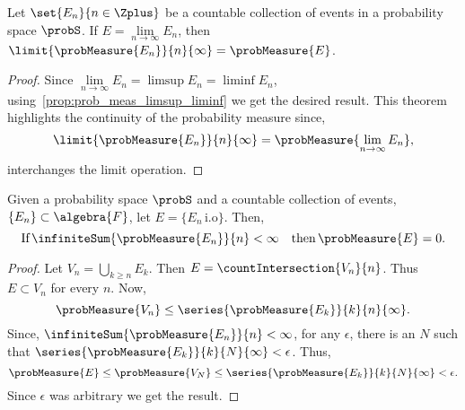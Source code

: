 \begin{Theorem}[name=Continuity of Probability measure]\label{thm:continuity_prob_measure}
    Let $\set{E_n}{n\in\Zplus}$ be a countable collection of events in a probability space $\probS$.
    If $E = \lim\limits_{n\to\infty}E_n$, then $\limit{\probMeasure{E_n}}{n}{\infty} = \probMeasure{E}$. 
\end{Theorem}
\begin{proof}
    Since $\lim\limits_{n\to\infty}E_n = \limsup E_n = \liminf E_n$,
    using~\ref{prop:prob_meas_limsup_liminf} we get the desired result. This theorem highlights the
    continuity of the probability measure since,
    \[\limit{\probMeasure{E_n}}{n}{\infty} = \probMeasure{\lim\limits_{n\to\infty}E_n},\]
    interchanges the limit operation.
\end{proof}
\begin{Theorem}[name=First Borel-Cantelli Lemma]\label{thm:borel_cantelli_1}
    Given a probability space $\probS$ and a countable collection of events, $\lbrace E_n \rbrace
    \subset \algebra{F}$, let $E = \lbrace E_n \,\text{i.o}\rbrace$. Then,
    \[\text{If}\,\infiniteSum{\probMeasure{E_n}}{n} < \infty\quad\text{then}\, \probMeasure{E} = 0.\]
\end{Theorem}
\begin{proof}
    Let $V_n = \bigcup\limits_{k\geq n}E_k$. Then $E = \countIntersection{V_n}{n}$. Thus $E \subset
    V_n$ for every $n$. Now,
    \[\probMeasure{V_n} \leq \series{\probMeasure{E_k}}{k}{n}{\infty}.\]
    Since, $\infiniteSum{\probMeasure{E_n}}{n} < \infty$, for any $\epsilon$, there is an $N$ such
    that $\series{\probMeasure{E_k}}{k}{N}{\infty} < \epsilon$. Thus,
    \[\probMeasure{E} \leq \probMeasure{V_N} \leq 
	\series{\probMeasure{E_k}}{k}{N}{\infty} < \epsilon.\]
    Since $\epsilon$ was arbitrary we get the result.
\end{proof}
